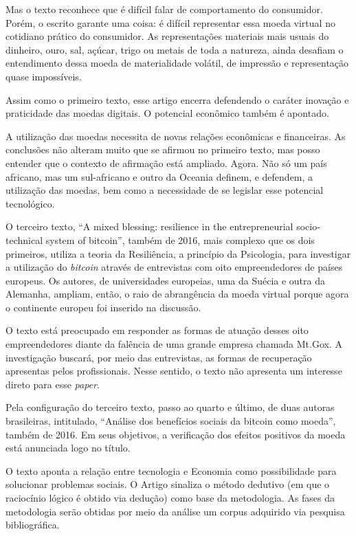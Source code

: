 \documentclass[12pt]{article}
\begin{document}
Mas o texto reconhece que é difícil falar de comportamento do consumidor. Porém, o escrito garante uma coisa: é difícil representar essa moeda virtual no cotidiano prático do consumidor. As representações materiais mais usuais do dinheiro, ouro, sal, açúcar, trigo ou metais de toda a natureza, ainda desafiam o entendimento dessa moeda de materialidade volátil, de impressão e representação quase impossíveis.

Assim como o primeiro texto, esse artigo encerra defendendo o caráter inovação e praticidade das moedas digitais. O potencial econômico também é apontado.

A utilização das moedas necessita de novas relações econômicas e financeiras. As conclusões não alteram muito que se afirmou no primeiro texto, mas posso entender que o contexto de afirmação está ampliado. Agora. Não só um país africano, mas um sul-africano e outro da Oceania definem, e defendem, a utilização das moedas, bem como a necessidade de se legislar esse potencial tecnológico.

O terceiro texto, “A mixed blessing: resilience in the entrepreneurial socio-technical system of bitcoin”, também de 2016, mais complexo que os dois primeiros, utiliza a teoria da Resiliência, a princípio da Psicologia, para investigar a utilização do \textit{bitcoin} através de entrevistas com oito empreendedores de países europeus. Os autores, de universidades europeias, uma da Suécia e outra da Alemanha, ampliam, então, o raio de abrangência da moeda virtual porque agora o continente europeu foi inserido na discussão.

O texto está preocupado em responder as formas de atuação desses oito empreendedores diante da falência de uma grande empresa chamada Mt.Gox. A investigação buscará, por meio das entrevistas, as formas de recuperação apresentas pelos profissionais. Nesse sentido, o texto não apresenta um interesse direto para esse \textit{paper}.

Pela configuração do terceiro texto, passo ao quarto e último, de duas autoras brasileiras, intitulado, “Análise dos benefícios sociais da bitcoin como moeda”, também de 2016. Em seus objetivos, a verificação dos efeitos positivos da moeda está anunciada logo no título.

O texto aponta a relação entre tecnologia e Economia como possibilidade para solucionar problemas sociais. O Artigo sinaliza o método dedutivo (em que o raciocínio lógico é obtido via dedução) como base da metodologia. As fases da metodologia serão obtidas por meio da análise um corpus adquirido via pesquisa bibliográfica.
\end{document}
